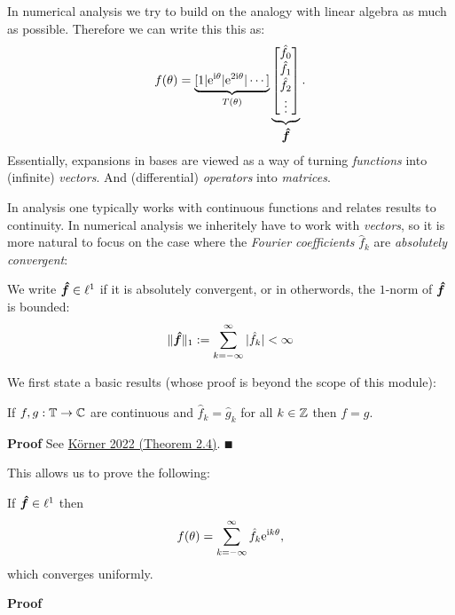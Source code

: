 In numerical analysis we try to build on the analogy with linear algebra as much as possible. Therefore we  can write this this as:
\[
f(\theta) = \underbrace{[1 | {\rm e}^{{\rm i}\theta} | {\rm e}^{2{\rm i}\theta} | \cdots]}_{T(\theta)}
\underbrace{\begin{bmatrix} \hat f_0 \\ \hat f_1 \\ \hat f_2 \\ \vdots \end{bmatrix}}_{{\mbox{\boldmath$\hat f$\unboldmath}}}.
\]
Essentially, expansions in bases are viewed as a way of turning \emph{functions} into (infinite) \emph{vectors}. And (differential) \emph{operators} into \emph{matrices}.

In analysis one typically works with continuous functions and relates results to continuity. In numerical analysis we inheritely have to work with \emph{vectors}, so it is more natural to  focus on the case where the \emph{Fourier coefficients} $\hat f_k$ are \emph{absolutely convergent}:

\begin{definition} We write ${\mbox{\boldmath$\hat f$\unboldmath}} \in \ell^1$ if it is absolutely convergent, or in otherwords, the $1$-norm of ${\mbox{\boldmath$\hat f$\unboldmath}}$ is bounded:
\[
\|{\mbox{\boldmath$\hat f$\unboldmath}}\|_1 := \sum_{k=-\infty}^\infty |\hat f_k| < \infty
\]
\end{definition}

We first state a  basic results (whose proof is beyond the scope of this module):

\begin{theorem} If $f, g : {\mathbb T} \rightarrow {\mathbb C}$ are continuous and $\hat f_k = \hat g_k$ for all $k \in {\mathbb Z}$ then $f = g$.

\end{theorem}
\textbf{Proof} See \href{https://www.cambridge.org/core/books/fourier-analysis/5FD8F0FD69DDB139019655D7F8440D2F}{Körner 2022 (Theorem 2.4)}. \ensuremath{\QED}

This allows us to prove the following:

\begin{theorem} If ${\mbox{\boldmath$\hat f$\unboldmath}} \in \ell^1$ then
\[
f(\ensuremath{\theta}) = \ensuremath{\sum}_{k = -\ensuremath{\infty}}^\ensuremath{\infty} \hat f_k {\rm e}^{{\rm i} k \ensuremath{\theta}},
\]
which converges uniformly. \end{theorem}
\textbf{Proof}

